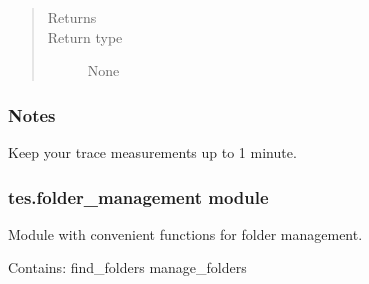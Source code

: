 \documentclass[letterpaper,10pt,english]{sphinxmanual}
\begin{document}
\begin{fulllineitems}
\begin{quote}
\begin{description}
\begin{itemize}
\end{itemize}

\item[{Returns}] \leavevmode
\sphinxAtStartPar


\item[{Return type}] \leavevmode
\sphinxAtStartPar
None

\end{description}\end{quote}
\subsubsection*{Notes}

\sphinxAtStartPar
Keep your trace measurements up to 1 minute.

\end{fulllineitems}



\subsubsection{tes.folder\_management module}
\label{\detokenize{tes:module-tes.folder_management}}\label{\detokenize{tes:tes-folder-management-module}}
\sphinxAtStartPar
Module with convenient functions for folder management.

\sphinxAtStartPar
Contains:
\sphinxhyphen{} find\_folders
\sphinxhyphen{} manage\_folders
\end{document}
